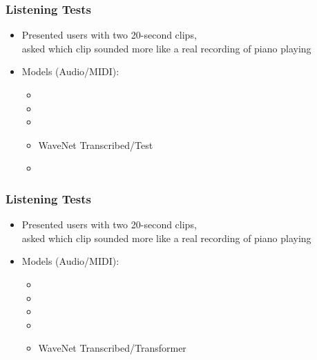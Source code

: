 \documentclass[dvipdfmx]{beamer}
\begin{document}
\begin{frame}[noframenumbering]
    \frametitle{Listening Tests}
    \begin{itemize}
        \item Presented users with two 20-second clips, \\
            asked which clip sounded more like a real recording of piano playing
    \end{itemize}
    \begin{itemize}
        \item Models {\scriptsize (Audio/MIDI)}:
        \begin{itemize}
            \item {}
            \item {}
            \item {}
            \item \alert{WaveNet Transcribed/Test}
            \item {}
        \end{itemize}
    \end{itemize}
\end{frame}


\begin{frame}[noframenumbering]
    \frametitle{Listening Tests}
    \begin{itemize}
        \item Presented users with two 20-second clips, \\
            asked which clip sounded more like a real recording of piano playing
    \end{itemize}
    \begin{itemize}
        \item Models {\scriptsize (Audio/MIDI)}:
        \begin{itemize}
            \item {}
            \item {}
            \item {}
            \item {}
            \item \alert{WaveNet Transcribed/Transformer}
        \end{itemize}
    \end{itemize}
\end{frame}
\end{document}
